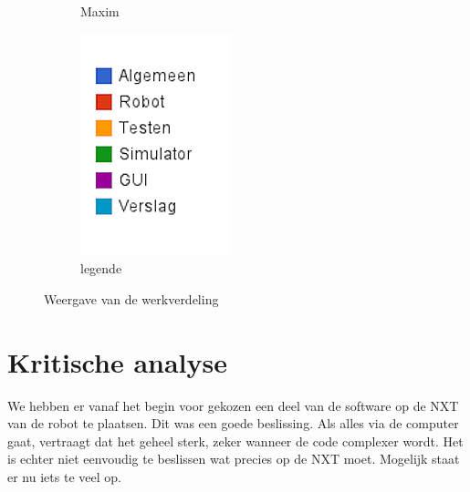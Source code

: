 \documentclass[eind]{penoverslag}
\begin{document}
\begin{figure}
\begin{subfigure}[hb]{0.15\textwidth}
                \caption{Maxim}
        \end{subfigure}%
        \begin{subfigure}[hb]{0.11\textwidth}
                \centering
                \includegraphics[width=\textwidth]{werk_legende}
                \caption{legende}
        \end{subfigure}
 \caption{Weergave van de werkverdeling}
\label{fig:werkverdeling}
\end{figure}

\section{Kritische analyse}
\label{Assec:kritischeAnalyse}
We hebben er vanaf het begin voor gekozen een deel van de software op de NXT van de robot te plaatsen. Dit was een goede beslissing. Als alles via de computer gaat, vertraagt dat het geheel sterk, zeker wanneer de code complexer wordt. Het is echter niet eenvoudig te beslissen wat precies op de NXT moet. Mogelijk staat er nu iets te veel op.\\
\end{document}
